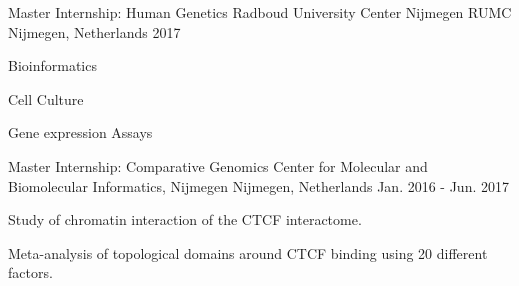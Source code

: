 

\begin{cventries}

  \cventry
    {Master Internship:} %
    {Human Genetics} %
    {Radboud University Center Nijmegen RUMC} %
    {Nijmegen, Netherlands}
    {2017} %
    {
      \begin{cvitems} %
        \item {Bioinformatics}
        \item {Cell Culture}
        \item {Gene expression Assays}
      \end{cvitems}
    }

  \cventry
    {Master Internship:} %
    {Comparative Genomics} %
    {Center for Molecular and Biomolecular Informatics, Nijmegen} %
    {Nijmegen, Netherlands} %
    {Jan. 2016 - Jun. 2017} %
    {
      \begin{cvitems} %
        \item {Study of chromatin interaction of the CTCF interactome.}
        \item {Meta-analysis of topological domains around CTCF binding using 20 different factors.}
      \end{cvitems}
    }
\end{cventries}
